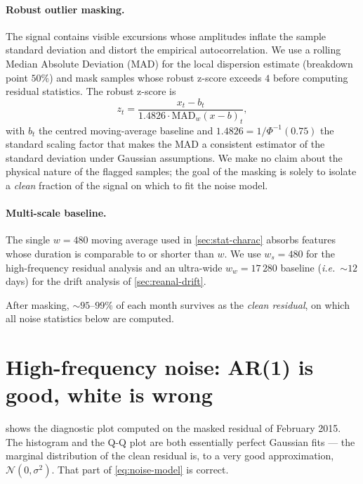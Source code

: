 \paragraph{Robust outlier masking.}
The signal contains visible excursions whose amplitudes inflate the
sample standard deviation and distort the empirical autocorrelation.
We use a rolling Median Absolute Deviation (MAD) for the local
dispersion estimate (breakdown point $50\%$) and mask samples whose
robust z-score exceeds $4$ before computing residual statistics. The
robust z-score is
\begin{equation}
    z_t = \frac{x_t - b_t}{1.4826 \cdot \mathrm{MAD}_w(x - b)_t},
    \label{eq:robust-z}
\end{equation}
with $b_t$ the centred moving-average baseline and $1.4826 =
1/\Phi^{-1}(0.75)$ the standard scaling factor that makes the
MAD a consistent estimator of the standard deviation under Gaussian
assumptions. We make no claim about the physical nature of the
flagged samples; the goal of the masking is solely to isolate a
\emph{clean} fraction of the signal on which to fit the noise model.

\paragraph{Multi-scale baseline.}
The single $w = 480$ moving average used in \cref{sec:stat-charac}
absorbs features whose duration is comparable to or shorter than $w$.
We use $w_s = 480$ for the high-frequency residual analysis and an
ultra-wide $w_w = 17\,280$ baseline (\emph{i.e.}\ $\sim 12$ days) for
the drift analysis of \cref{sec:reanal-drift}.

After masking, $\sim 95$--$99\%$ of each month survives as the
\emph{clean residual}, on which all noise statistics below are
computed.

\section{High-frequency noise: AR(1) is good, white is wrong}
\label{sec:reanal-noise}

 shows the diagnostic plot computed on
the masked residual of February 2015. The histogram and the Q-Q plot
are both essentially perfect Gaussian fits --- the marginal
distribution of the clean residual is, to a very good approximation,
$\mathcal{N}(0, \sigma^2)$. That part of \cref{eq:noise-model} is
correct.

